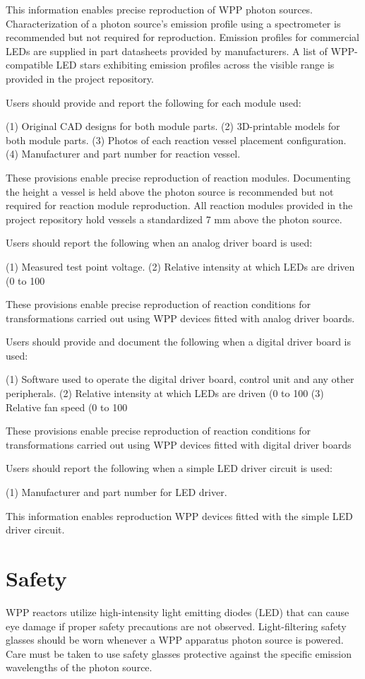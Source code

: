 \documentclass[11pt]{article}
\let\stdsection\section
\renewcommand\section{\clearpage\stdsection}
\begin{document}
This information enables precise reproduction of WPP photon sources. Characterization of a photon source’s emission profile using a spectrometer is recommended but not required for reproduction. Emission profiles for commercial LEDs are supplied in part datasheets provided by manufacturers. A list of WPP-compatible LED stars exhibiting emission profiles across the visible range is provided in the project repository.

Users should provide and report the following for each module used:

    (1) Original CAD designs for both module parts.
    (2) 3D-printable models for both module parts.
    (3) Photos of each reaction vessel placement configuration.
    (4) Manufacturer and part number for reaction vessel.

These provisions enable precise reproduction of reaction modules. Documenting the height a vessel is held above the photon source is recommended but not required for reaction module reproduction. All reaction modules provided in the project repository hold vessels a standardized 7 mm above the photon source.

Users should report the following when an analog driver board is used:

    (1) Measured test point voltage.
    (2) Relative intensity at which LEDs are driven (0 to 100%

These provisions enable precise reproduction of reaction conditions for transformations carried out using WPP devices fitted with analog driver boards.

Users should provide and document the following when a digital driver board is used:

    (1) Software used to operate the digital driver board, control unit and any other peripherals.
    (2) Relative intensity at which LEDs are driven (0 to 100%
    (3) Relative fan speed (0 to 100%

These provisions enable precise reproduction of reaction conditions for transformations carried out using WPP devices fitted with digital driver boards

Users should report the following when a simple LED driver circuit is used:

    (1) Manufacturer and part number for LED driver.

This information enables reproduction WPP devices fitted with the simple LED driver circuit.

\section{Safety}

WPP reactors utilize high-intensity light emitting diodes (LED) that can cause eye damage if proper safety precautions are not observed.
Light-filtering safety glasses should be worn whenever a WPP apparatus photon source is powered.
Care must be taken to use safety glasses protective against the specific emission wavelengths of the photon source.
\end{document}
